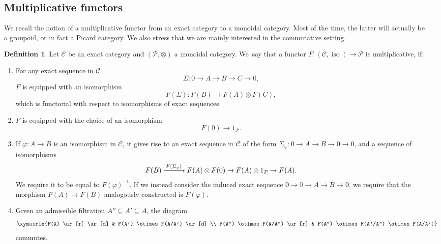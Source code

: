 \documentclass[JEP,XML,SOM,Unicode,published]{cedram}
\newcommand\To[1]{\mathchoice{\xrightarrow{\kern1pt#1\kern1pt}}{\stackrel{#1}{\longrightarrow}}{}{}}
\theoremstyle{plain}
\theoremstyle{definition}
\newtheorem{definition}[theorem]{Definition}
\newcommand{\Ccal}{\mathcal C}
\newcommand{\Pcal}{\mathcal P}
\DeclareMathOperator{\iso}{iso}
\begin{document}
\subsection{Multiplicative functors}\label{subsec:multfunctor}
We recall the notion of a multiplicative functor from an exact category to a monoidal category. Most of the time, the latter will actually be a groupoid, or in fact a Picard category. We also stress that we are mainly interested in the commutative setting.
\begin{definition}\label{def:multiplicative-functor}
Let $\Ccal$ be an exact category and $(\Pcal,\otimes)$ a monoidal category. We~say that a functor $F: (\Ccal, \iso) \to \Pcal$ is multiplicative, if:
\begin{enumerate}
\item\label{item:mult-funct-1} For any exact sequence in $\Ccal$
\begin{displaymath}
\Sigma\colon 0 \to A \to B \to C \to 0,
\end{displaymath}
$F$ is equipped with an isomorphism
\begin{displaymath}
F(\Sigma): F(B) \to F(A) \otimes F(C),
\end{displaymath}
which is functorial with respect to isomorphisms of exact sequences.
\item\label{item:mult-funct-2} $F$ is equipped with the choice of an isomorphism
\begin{displaymath}
F(0) \to 1_{\Pcal}.
\end{displaymath}
\item\label{item:mult-funct-3} If $\varphi\colon A \to B$ is an isomorphism in $\Ccal$, it gives rise to an exact sequence in $\Ccal$ of the form $\Sigma_{\varphi}: 0 \to A \to B \to 0 \to 0$, and a sequence of isomorphisms
\begin{displaymath}
F(B) \To{F(\Sigma_{\varphi})} F(A) \otimes F(0) \to F(A) \otimes 1_{\Pcal} \to F(A).
\end{displaymath}
We require it to be equal to $F(\varphi)^{-1}$. If we instead consider the induced exact sequence $0 \to 0 \to A \to B \to 0$, we require that the morphism $F(A) \to F(B)$ analogously constructed is $F(\varphi)$.
\item\label{item:mult-funct-4} Given an admissible filtration $A'' \subseteq A' \subseteq A$, the diagram
\begin{displaymath}
\xymatrix{F(A) \ar[r] \ar[d] & F(A') \otimes F(A/A') \ar[d] \\
F(A'') \otimes F(A/A'') \ar[r] & F(A'') \otimes F(A'/A'') \otimes F(A/A')}
\end{displaymath}
commutes.


\end{enumerate}
\end{definition}
\end{document}
